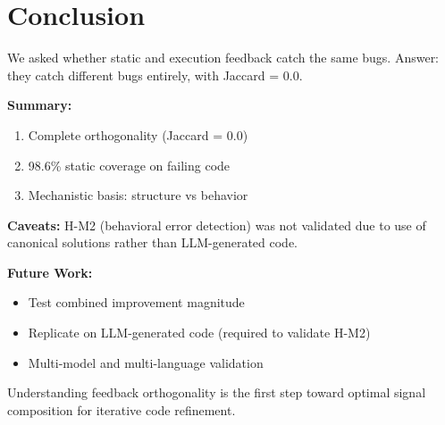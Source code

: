 \section{Conclusion}
\label{sec:conclusion}

We asked whether static and execution feedback catch the same bugs. Answer: they catch different bugs entirely, with Jaccard = 0.0.

\textbf{Summary:}
\begin{enumerate}
    \item Complete orthogonality (Jaccard = 0.0)
    \item 98.6\% static coverage on failing code
    \item Mechanistic basis: structure vs behavior
\end{enumerate}

\textbf{Caveats:} H-M2 (behavioral error detection) was not validated due to use of canonical solutions rather than LLM-generated code.

\textbf{Future Work:}
\begin{itemize}
    \item Test combined improvement magnitude
    \item Replicate on LLM-generated code (required to validate H-M2)
    \item Multi-model and multi-language validation
\end{itemize}

Understanding feedback orthogonality is the first step toward optimal signal composition for iterative code refinement.
